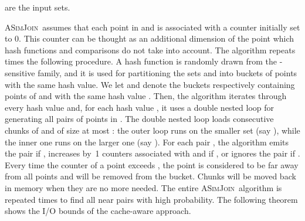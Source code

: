 \documentclass{llncs}
\newcommand{\ASimJoin}{\textsc{ASimJoin}}
\begin{document}
\SetCommentSty{}
\begin{algorithm}[!t]
\label{alg:ASimJoin}
\SetAlgoRefName{\ASimJoin}
\caption{ are the input sets.}\label{algo:awaresimjoin}
\small

\end{algorithm}

\ASimJoin\ assumes that each point in  and  is associated with a counter initially set to 0. 
This counter can be thought as an additional dimension of the point which hash functions and comparisons do not take into account.
The algorithm repeats  times the following procedure.
A hash function is randomly drawn from the -sensitive family, and it is used for partitioning the sets  and  into buckets of points with the same hash value.
We let  and  denote the buckets respectively containing points of  and  with the same hash value .
Then, the algorithm iterates through every hash value and, for each hash value , it uses a double nested loop for generating all pairs of points in .
The double nested loop loads consecutive chunks of  and  of size at most : the outer loop runs on the smaller set (say ), while the inner one runs on the larger one (say ).
For each pair , the algorithm emits the pair if ,  increases by~1 counters associated with  and  if ,
or ignores the pair if  .
Every time the counter of a point exceeds , the point is considered to be
far away from all points and will be removed from the bucket. 
Chunks will be moved back in memory when they are no more needed. 
The entire \ASimJoin\ algorithm is repeated  times to find all
near pairs with high
probability. 
The following theorem shows the I/O bounds of the cache-aware approach.
\end{document}

